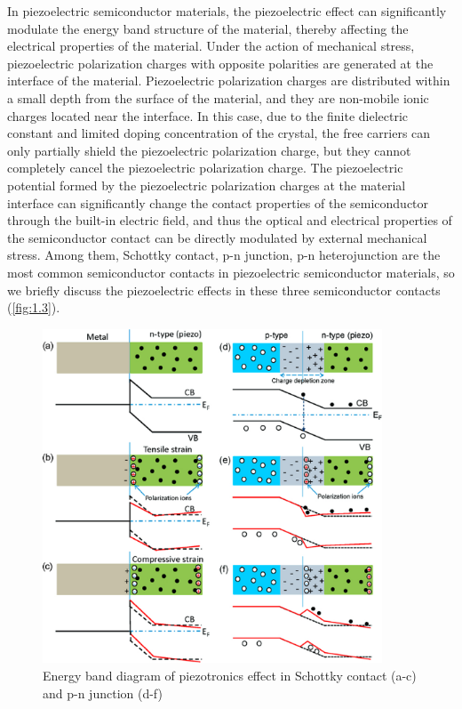 In piezoelectric semiconductor materials, the piezoelectric effect  can significantly modulate the energy band  structure of the material, thereby affecting the electrical properties of the material. Under the action of mechanical stress, piezoelectric polarization charges  with opposite polarities are generated at the interface  of the material. Piezoelectric polarization charges are distributed within a small depth from the surface  of the material, and they are non-mobile ionic charges located near the interface. In this case, due to the finite dielectric constant and limited doping concentration of the  crystal, the free carriers can only partially shield the piezoelectric polarization  charge, but they cannot completely cancel the piezoelectric polarization charge. The piezoelectric potential  formed by the piezoelectric polarization charges at the material interface can significantly change the contact properties of the semiconductor through the built-in  electric field, and thus the optical and electrical properties of the semiconductor contact can be directly modulated by external mechanical stress. Among them, Schottky  contact, p-n junction, p-n heterojunction are the most common semiconductor contacts in piezoelectric semiconductor materials, so we briefly discuss the piezoelectric effects  in these three semiconductor contacts (\autoref{fig:1.3}).

\begin{figure}[H] 
\centering    
\includegraphics[width=0.9\textwidth]{ch1_3}
\caption[Energy band diagram of piezotronics effect in Schottky contact and p-n junction]{Energy band diagram of piezotronics effect in Schottky contact (a-c) and p-n junction (d-f) \protect\cite{wang2012piezotronics}}
\label{fig:1.3}
\end{figure}


